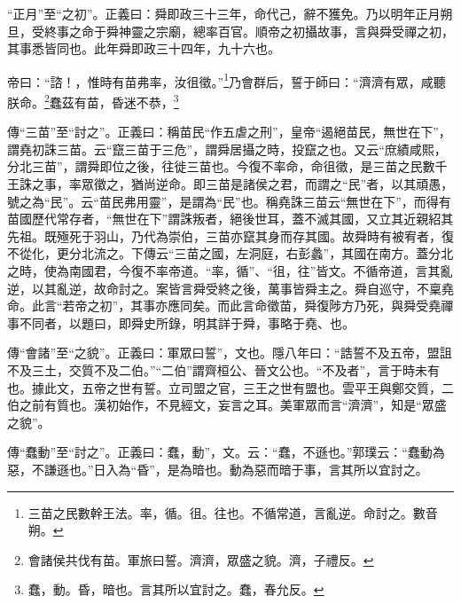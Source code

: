 {\noindent\shu{}\fzkt “正月”至“之初”。正義曰：舜即政三十三年，命代己，辭不獲免。乃以明年正月朔旦，受終事之命于舜神靈之宗廟，總率百官。順帝之初攝故事，言與舜受禪之初，其事悉皆同也。此年舜即政三十四年，九十六也。 \par}

帝曰：“諮！，惟時有苗弗率，汝徂徵。”\footnote{三苗之民數幹王法。率，循。徂。往也。不循常道，言亂逆。命討之。數音朔。}乃會群后，誓于師曰：“濟濟有眾，咸聽朕命。\footnote{會諸侯共伐有苗。軍旅曰誓。濟濟，眾盛之貌。濟，子禮反。}蠢茲有苗，昏迷不恭，\footnote{蠢，動。昏，暗也。言其所以宜討之。蠢，春允反。}

{\noindent\zhuan{}\fzbyks 傳“三苗”至“討之”。正義曰：稱苗民“作五虐之刑”，皇帝“遏絕苗民，無世在下”，謂堯初誅三苗。云“竄三苗于三危”，謂舜居攝之時，投竄之也。又云“庶績咸熙，分北三苗”，謂舜即位之後，往徙三苗也。今復不率命，命徂徵，是三苗之民數千王誅之事，率眾徵之，猶尚逆命。即三苗是諸侯之君，而謂之“民”者，以其頑愚，號之為“民”。云“苗民弗用靈”，是謂為“民”也。稱堯誅三苗云“無世在下”，而得有苗國歷代常存者，“無世在下”謂誅叛者，絕後世耳，蓋不滅其國，又立其近親紹其先祖。既殛死于羽山，乃代為崇伯，三苗亦竄其身而存其國。故舜時有被宥者，復不從化，更分北流之。下傳云“三苗之國，左洞庭，右彭蠡”，其國在南方。蓋分北之時，使為南國君，今復不率帝道。“率，循”、“徂，往”皆文。不循帝道，言其亂逆，以其亂逆，故命討之。案皆言舜受終之後，萬事皆舜主之。舜自巡守，不稟堯命。此言“若帝之初”，其事亦應同矣。而此言命徵苗，舜復陟方乃死，與舜受堯禪事不同者，以題曰，即舜史所錄，明其詳于舜，事略于堯、也。 \par}

{\noindent\zhuan{}\fzbyks 傳“會諸”至“之貌”。正義曰：軍眾曰誓”，文也。隱八年曰：“誥誓不及五帝，盟詛不及三土，交質不及二伯。”“二伯”謂齊桓公、晉文公也。“不及者”，言于時未有也。據此文，五帝之世有誓。立司盟之官，三王之世有盟也。雲平王與鄭交質，二伯之前有質也。漢初始作，不見經文，妄言之耳。美軍眾而言“濟濟”，知是“眾盛之貌”。 \par}

{\noindent\zhuan{}\fzbyks 傳“蠢動”至“討之”。正義曰：蠢，動”，文。云：“蠢，不遜也。”郭璞云：“蠢動為惡，不謙遜也。”日入為“昏”，是為暗也。動為惡而暗于事，言其所以宜討之。 \par}

